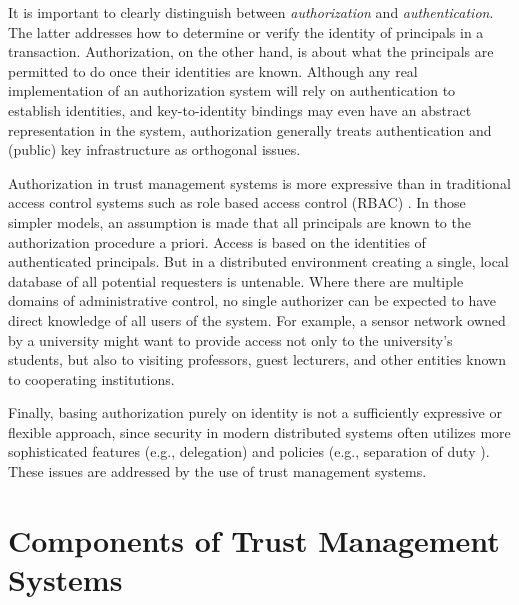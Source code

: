 It is important to clearly distinguish between \emph{authorization} and \emph{authentication}.
The latter addresses how to determine or verify the identity of principals in a transaction.
Authorization, on the other hand, is about what the principals are permitted to do once their
identities are known. Although any real implementation of an authorization system will rely on
authentication to establish identities, and key-to-identity bindings may even have an abstract
representation in the system, authorization generally treats authentication and (public) key
infrastructure as orthogonal issues.

Authorization in trust management systems is more expressive than in traditional access control
systems such as role based access control (RBAC) \cite{Sandhu:RBACM}. In those simpler models,
an assumption is made that all principals are known to the authorization procedure a priori.
Access is based on the identities of authenticated principals. But in a distributed environment
creating a single, local database of all potential requesters is untenable. Where there are
multiple domains of administrative control, no single authorizer can be expected to have direct
knowledge of all users of the system. For example, a sensor network owned by a university might
want to provide access not only to the university's students, but also to visiting professors,
guest lecturers, and other entities known to cooperating institutions.

Finally, basing authorization purely on identity is not a sufficiently expressive or flexible
approach, since security in modern distributed systems often utilizes more sophisticated
features (e.g., delegation) and policies (e.g., separation of duty \cite{Simon:SODRBE}). These
issues are addressed by the use of trust management systems.

\section{Components of Trust Management Systems}
\label{section-components}

